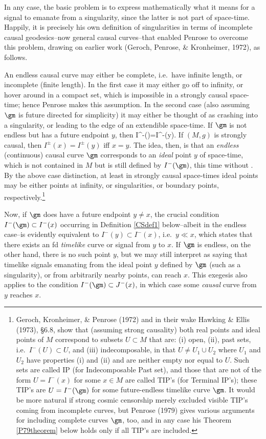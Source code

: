 \documentclass[12pt]{article}
\begin{document}
 In any case, the basic problem is to express mathematically what it means for a signal to emanate from a singularity, since the latter is not part of space-time. Happily, it is precisely his own definition of singularities in terms of incomplete causal 
 geodesics--now general causal curves--that enabled Penrose to overcome this problem, drawing on earlier work (Geroch, Penrose, \& Kronheimer, 1972), as follows.  
 
 An endless causal curve may either be complete, i.e.\ have infinite  length, or incomplete (finite length). In the first case it may either go off to infinity, or hover around in a compact set, which  is impossible in a strongly causal space-time; hence Penrose makes this assumption.  In the second case (also assuming $\gm$ is future directed for simplicity) it may either be thought of as  crashing into a singularity, or leading to the edge of an extendible space-time. If $\gm$ is not endless but has a future endpoint $y$, then
 \beq
 I^-(\gm)=I^-(y). \label{IgmIy}
 \eeq
  If $(M,g)$ is strongly causal, then 
$I^{\pm}(x)=I^{\pm}(y)$ iff $x=y$. The idea, then, is that an \emph{endless} (continuous) causal curve $\gm$ corresponds to an \emph{ideal} point 
 $y$ of space-time, which is not contained in $M$ but is still defined by $I^-(\gm)$, this time without .
 By the above case distinction, at least in strongly causal space-times ideal points may be either points at infinity, or singularities, or  boundary points, respectively.\footnote{\label{GKP72}    Geroch, Kronheimer, \&  Penrose (1972) and in their wake Hawking \& Ellis (1973), \S 6.8, show that
 (assuming strong causality) both real points and ideal points of $M$ correspond to subsets  $U\subset M$ that are:
 (i) open, (ii), past sets, i.e.\ $I^-(U)\subset U$, and (iii) indecomposable, in that $U\neq U_1\cup U_2$ where $U_1$ and $U_2$ have properties (i) and (ii) and are neither empty nor equal to $U$. Such sets are called IP (for Indecomposable Past set), and those that are not of the form $U=I^-(x)$ for some $x\in M$ are called TIP's (for Terminal IP's);  these TIP's are $U=I^-(\gm)$ for some  future-endless timelike curve $\gm$. It would  be more natural if strong cosmic censorship merely excluded visible TIP's coming from incomplete curves, but Penrose (1979) gives various arguments for including complete curves $\gm$, too, and in any case his Theorem 
 \ref{P79theorem} below holds only if all TIP's are included.  }
 
\noindent   Now, if $\gm$ does have a future endpoint $y\neq x$, the crucial condition 
$I^-(\gm)\subset I^-(x)$
  occurring in Definition \ref{CSdef1} below--albeit in the endless case--is evidently equivalent to $I^-(y)\subset I^-(x)$, i.e.\ $y\ll x$, which  states that there exists an fd \emph{timelike} curve or signal from $y$ to $x$. If $\gm$ is endless, on the other hand, there is no such point $y$, but we may still interpret  as saying that  timelike signals emanating from the ideal point $y$ defined by $\gm$ (such as a singularity), or from arbitrarily nearby points, can reach $x$.  
  This exegesis also applies to the condition  $I^-(\gm)\subset J^-(x)$, in which case some \emph{causal} curve from $y$  reaches $x$. 
  
\end{document}
